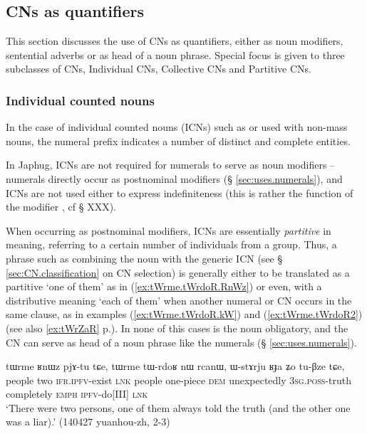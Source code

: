 \subsection{CNs as quantifiers} \label{sec:CN.quantifier}
This section discusses the use of CNs as quantifiers, either as noun modifiers, sentential adverbs or as head of a noun phrase. Special focus is given to three subclasses of CNs, Individual CNs, Collective CNs and Partitive CNs.

\subsubsection{Individual counted nouns} \label{sec:ICN}
In the case of individual counted nouns (ICNs) such as  or  used with non-mass nouns, the numeral prefix indicates a number of distinct and complete entities.

In Japhug, ICNs are not required for numerals to serve as noun modifiers -- numerals  directly occur as postnominal modifiers (§ \ref{sec:uses.numerals}), and ICNs are not used either to express indefiniteness (this is rather the function of the modifier , cf  § XXX).

When occurring as postnominal modifiers, ICNs are essentially \textit{partitive} in meaning, referring to a certain number of individuals from a group. Thus, a phrase such as   combining the noun  with the generic ICN  (see §  \ref{sec:CN.classification} on CN selection) is generally either to be translated as a partitive `one of them'  as in (\ref{ex:tWrme.tWrdoR.RnWz}) or even, with a distributive meaning  `each of them' when another numeral or CN occurs in the same clause, as in examples (\ref{ex:tWrme.tWrdoR.kW}) and (\ref{ex:tWrme.tWrdoR2}) (see also \ref{ex:tWrZaR} p.\pageref{ex:tWrZaR}). In none of this cases is the noun   obligatory, and the CN can serve as head of a noun phrase like the numerals (§ \ref{sec:uses.numerals}).

\begin{exe}
\ex \label{ex:tWrme.tWrdoR.RnWz}
\gll tɯrme ʁnɯz pjɤ-tu tɕe, tɯrme tɯ-rdoʁ nɯ rcanɯ, ɯ-stɤrju ʁɟa ʑo tu-βze tɕe, \\
people two \textsc{ifr}.\textsc{ipfv}-exist \textsc{lnk} people one-piece \textsc{dem} unexpectedly \textsc{3sg}.\textsc{poss}-truth completely \textsc{emph} \textsc{ipfv}-do[III] \textsc{lnk} \\
\glt `There were two persons, one of them always told the truth (and the other one was a liar).' (140427 yuanhou-zh, 2-3)
\end{exe} 

